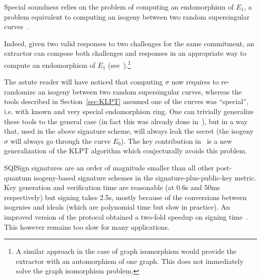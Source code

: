 Special soundness relies on the problem of computing an endomorphism of $E_1$, a problem equivalent to computing an isogeny between two random supersingular  curves~\cite{GPS20,Reductions18,Wes22}.


%
Indeed, given two valid responses to two challenges for the same commitment, an extractor can compose both challenges and responses in an appropriate way  to compute an endomorphism of $E_1$ (see~\cite{DFKLPW20}).\footnote{A similar approach in the case of graph isomorphism would provide the extractor with an automorphism of one graph. This does not immediately solve the graph isomorphism problem.}

The astute reader will have noticed that computing $\sigma$ now requires to re-randomize an isogeny between two random supersingular curves, whereas the tools described in Section~\ref{sec:KLPT} assumed one of the curves was ``special'', i.e. with known and very special endomorphism ring. One can trivially generalize these tools to the general case (in fact this was already done in~\cite{KLPT}), but in a way that, used in the above signature scheme, will always leak the secret (the isogeny $\sigma$ will always go through the curve $E_0$). 
%
The key contribution in~\cite{DFKLPW20} is a new generalization of the KLPT algorithm which conjecturally avoids this problem. 

SQISign signatures are an order of magnitude smaller than all other post-quantum isogeny-based signature schemes in the signature-plus-public-key metric. Key generation and verification time are reasonable (at 0.6s and 50ms respectively) but signing takes 2.5s, mostly because of the conversions between isogenies and ideals (which are polynomial time but slow in practice).
%
An improved version of the protocol obtained a two-fold speedup on signing time~\cite{SQIsign2.0}.
%
This however remains too slow for many applications. 

